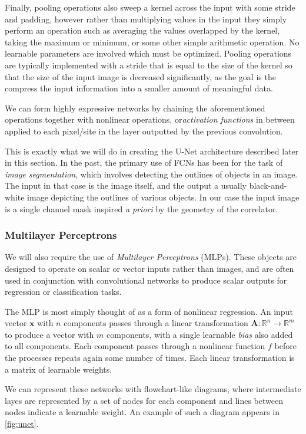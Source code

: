 \documentclass[12pt]{article}
\begin{document}
Finally, pooling operations also sweep a kernel across the input with some stride and padding, however rather than multiplying values in the input
they simply perform an operation such as averaging the values overlapped by the kernel, taking the maximum or minimum, or some other simple arithmetic operation. 
No learnable parameters are involved which must be optimized. Pooling operations are typically implemented with a stride that is equal to the size of the kernel so that the size of the input image is
decreased significantly, as the goal is the compress the input information into a smaller amount of meaningful data.

We can form highly expressive networks by chaining the aforementioned operations together with nonlinear operations, or\textit{activation functions} in between applied
to each pixel/site in the layer outputted by the previous convolution.

This is exactly what we will do in creating the U-Net architecture described later in this section. In the past, the primary use of FCNs has been for the task 
of \textit{image segmentation}, which involves detecting the outlines of objects in an image. The input in that case is the image itself, and the output
a usually black-and-white image depicting the outlines of various objects. In our case the input image is a single channel mask inspired \textit{a priori}
by the geometry of the correlator.

\subsubsection{Multilayer Perceptrons}

We will also require the use of \textit{Multilayer Perceptrons} (MLPs). These objects are designed to operate on scalar or vector inputs
rather than images, and are often used in conjunction with convolutional networks to produce scalar outputs for regression or classification tasks.

The MLP is most simply thought of as a form of nonlinear regression. An input vector $\mathbf{x}$ with $n$ components passes through a linear
transformation $\mathbf{A}:\mathbb{R}^n\to \mathbb{R}^m$ to produce a vector with $m$ components, with a single learnable \textit{bias} also added to all components. Each component passes through a nonlinear function $f$ 
before the processes repeats again some number of times. Each linear transformation is a matrix of learnable weights. 

We can represent these networks with flowchart-like diagrams, where intermediate layes are represented by a set of nodes for each component and lines between nodes
indicate a learnable weight. An example of such a diagram appears in \ref{fig:unet}.
\end{document}
